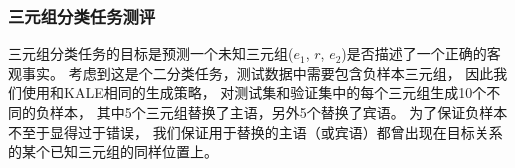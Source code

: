 




\subsubsection{三元组分类任务测评}
三元组分类任务的目标是预测一个未知三元组($e_1$, $r$, $e_2$)是否描述了一个正确的客观事实。
考虑到这是个二分类任务，测试数据中需要包含负样本三元组，
因此我们使用和KALE\cite{guo2016jointly}相同的生成策略，
对测试集和验证集中的每个三元组生成10个不同的负样本，
其中5个三元组替换了主语，另外5个替换了宾语。
为了保证负样本不至于显得过于错误，
我们保证用于替换的主语（或宾语）都曾出现在目标关系的某个已知三元组的同样位置上。

